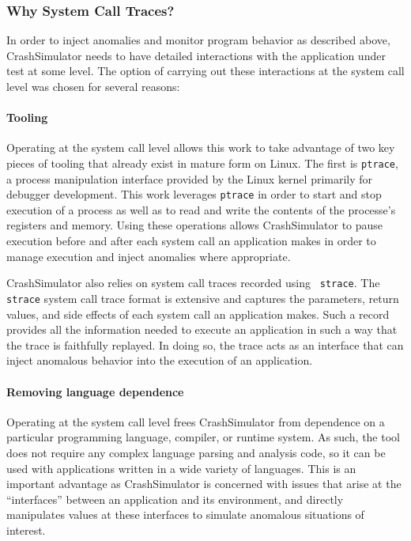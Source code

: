 \subsubsection{Why System Call Traces?}

In order to inject anomalies and monitor program behavior as described
above, CrashSimulator needs to have detailed interactions with the
application under test at some level.  The option of carrying out these
interactions at the system call level was chosen for several
reasons:

\paragraph{Tooling}

Operating at the system call level allows this work to take advantage of
two key pieces of tooling that already exist in mature form on Linux.
The first is {\tt ptrace}, a process manipulation interface provided
by the Linux kernel primarily for debugger development.
This work leverages {\tt ptrace} in order to start and stop execution of a
process as well as to read and write the contents of the processe's
registers and memory.  Using these operations allows CrashSimulator to
pause execution before and after each system call an application makes
in order to manage execution and inject anomalies where appropriate.

CrashSimulator also relies on system call traces recorded using {\tt
strace}.  The {\tt strace} system call trace format is extensive and
captures the parameters, return values, and side effects of each system
call an application makes.  Such a record provides
all the information needed to execute an application in
such a way that the trace is faithfully
replayed.  In doing so, the trace acts as an interface
that can inject anomalous behavior into the execution of an application.

\paragraph{Removing language dependence}

Operating at the system call level frees CrashSimulator from
dependence on a particular programming language, compiler, or runtime system.  
As such, the tool does not require any complex language parsing and
analysis code, %
so it can be used with applications written in a wide variety of languages.
This is an important advantage as CrashSimulator is concerned with issues that arise
at the ``interfaces'' between an application and its environment,
and directly manipulates values at these interfaces to simulate
anomalous situations of interest.

